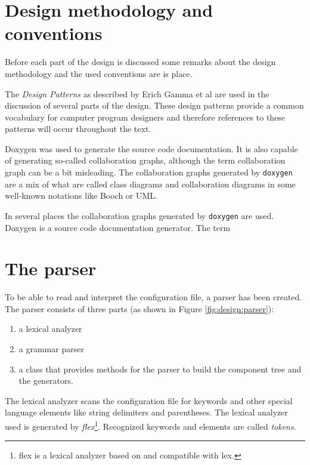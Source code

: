 \section{Design methodology and conventions}
Before each part of the design is discussed some remarks about the design
methodology and the used conventions are is place.

\bigskip \noindent
The \emph{Design Patterns} as described by Erich Gamma et al \cite{Gamma} are
used in the discussion of several parts of the design. These design patterns
provide a common vocabulary for computer program designers and therefore
references to these patterns will occur throughout the text.

\bigskip \noindent
Doxygen was used to generate the source code documentation. It is also capable
of generating so-called collaboration graphs, although the term collaboration
graph can be a bit misleading. The collaboration graphs generated by
\verb=doxygen= are a mix of what are called class diagrams and collaboration
diagrams in some well-known notations like Booch or UML.

In several places the collaboration graphs generated by
\verb=doxygen=\cite{doxygen} are used. Doxygen is a source code documentation
generator. The term

\section{The parser} \label{sect:design:parser}
To be able to read and interpret the configuration file, a parser has been
created. The parser consists of three parts (as shown in Figure
\ref{fig:design:parser}):
\begin{enumerate}
\item a lexical analyzer
\item a grammar parser
\item a class that provides methods for the parser to build the component tree
and the generators.
\end{enumerate}
The lexical analyzer scans the configuration file for keywords and other
special language elements like string delimiters and parentheses. The lexical
analyzer used is generated by \emph{flex}\footnote{flex is a lexical analyzer
based on and compatible with lex.}. Recognized keywords and elements are called
\emph{tokens}.

